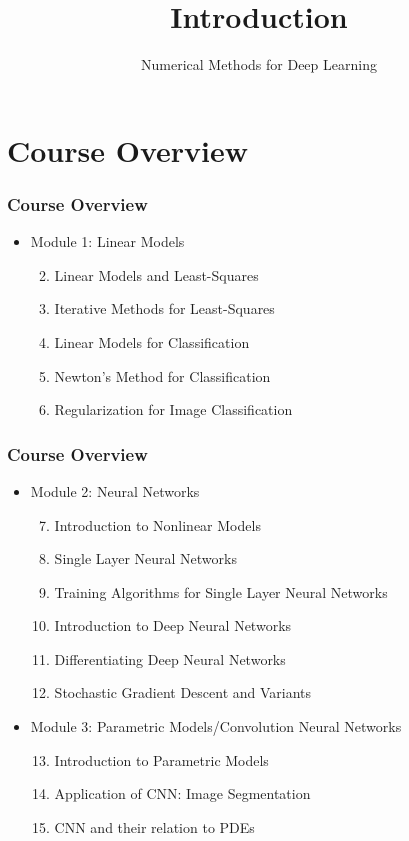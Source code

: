 \documentclass[12pt,fleqn]{beamer}
\title[Intro]{Introduction}
\subtitle{Numerical Methods for Deep Learning}
\date{}
\begin{document}
\makebeamertitle
\section{Course Overview} %
\label{sec:course_overview}
\begin{frame}
\frametitle{Course Overview}
\begin{itemize}
\item Module 1: Linear Models
\begin{enumerate}
	\setcounter{enumi}{1}	
\item Linear Models and Least-Squares
\item Iterative Methods for Least-Squares
\item Linear Models for Classification
\item Newton's Method for Classification
\item Regularization for Image Classification
\end{enumerate}
\end{itemize}

\end{frame}
\begin{frame}
\frametitle{Course Overview}

\begin{itemize}
\item Module 2: Neural Networks
\begin{enumerate}
	\setcounter{enumi}{6}
\item Introduction to Nonlinear Models
\item Single Layer Neural Networks
\item Training Algorithms for Single Layer Neural Networks
\item Introduction to Deep Neural Networks
\item Differentiating Deep Neural Networks
\item Stochastic Gradient Descent and Variants
\end{enumerate}
\item Module 3: Parametric Models/Convolution Neural Networks
\begin{enumerate}
	\setcounter{enumi}{12}
	\item Introduction to Parametric Models
	\item Application of CNN: Image Segmentation
	\item CNN and their relation to PDEs
\end{enumerate}
\end{itemize}
\end{frame}
\end{document}
